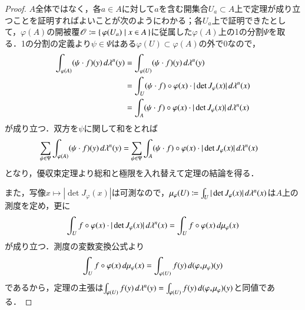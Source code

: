 \begin{proof}$A$全体ではなく，各$a \in A$に対して$a$を含む開集合$U_a \subset A$上で定理が成り立つことを証明すればよいことが次のようにわかる；各$U_a$上で証明できたとして，$\varphi(A)$の開被覆$\mathscr{O} \coloneqq \set{\varphi(U_a) | x \in A}$に従属した$\varphi(A)$上の1の分割$\Psi$を取る．1の分割の定義より$\psi \in \Psi$はある$\varphi(U) \subset \varphi(A)$の外で0なので，
\begin{align}
\int_{\varphi(A)} (\psi \cdot f)(y) \mathop{}\!d\lambda^n(y) &= \int_{\varphi(U)} (\psi \cdot f)(y) \mathop{}\!d\lambda^n(y)\\
&= \int_U (\psi \cdot f) \circ \varphi(x) \cdot | \det J_\varphi(x) | \mathop{}\!d \lambda^n(x) \\
&= \int_A (\psi \cdot f) \circ \varphi(x) \cdot | \det J_\varphi(x) | \mathop{}\!d \lambda^n(x)
\end{align}が成り立つ．双方を$\psi$に関して和をとれば
\begin{align}
\sum_{\psi \in \Psi}\int_{\varphi(A)} (\psi \cdot f)(y) \mathop{}\!d\lambda^n(y) &= \sum_{\psi \in \Psi} \int_A (\psi \cdot f) \circ \varphi(x) \cdot | \det J_\varphi(x) | \mathop{}\!d \lambda^n(x)
\end{align}となり，優収束定理より総和と極限を入れ替えて定理の結論を得る．

また，写像$x \mapsto |\det J_\varphi(x)|$は可測なので，$\mu_{\varphi}(U) \coloneqq \int_U |\det J_\varphi(x)| \mathop{}\!d \lambda^n(x)$は$A$上の測度を定め，更に
\begin{equation}
\int_U f \circ \varphi(x) \cdot | \det J_\varphi(x) | \mathop{}\!d \lambda^n(x) = \int_U f \circ \varphi(x) \mathop{}\!d \mu_\varphi(x)
\end{equation}
が成り立つ．測度の変数変換公式より
\begin{equation}
\int_U f \circ \varphi(x) \mathop{}\!d \mu_\varphi(x) = \int_{\varphi(U)} f(y) \mathop{}\!d(\varphi_* \mu_\varphi)(y)
\end{equation}
であるから，定理の主張は$\int_{\varphi(U)} f(y) \mathop{}\!d\lambda^n(y) = \int_{\varphi(U)} f(y) \mathop{}\!d(\varphi_* \mu_\varphi)(y)$と同値である．


\end{proof}
